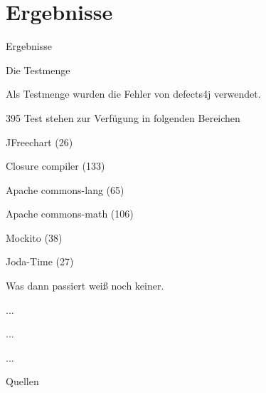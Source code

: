 \section{Ergebnisse}
%
\begin{frame}{}
	\begin{center}
		\huge{Ergebnisse}
	\end{center}
\end{frame}
%
\begin{frame}{Die Testmenge}
	\begin{itemizes}{1em}
		\item Als Testmenge wurden die Fehler von defects4j verwendet.
		\item 395 Test stehen zur Verfügung in folgenden Bereichen
		\begin{itemizes}{0.3em}
			\item JFreechart (26)
			\item Closure compiler (133)
			\item Apache commons-lang (65)
			\item Apache commons-math (106)
			\item Mockito (38)
			\item Joda-Time (27)
		\end{itemizes}
	\end{itemizes}
\end{frame}
%
\begin{frame}{}
\end{frame}
%
\begin{frame}{Was dann passiert weiß noch keiner.}
	\begin{itemizes}{1em}
		\item ...
		\item ...
		\item ...
	\end{itemizes}
\end{frame}
%

\begin{frame}{Quellen}
	
	
\end{frame}
%